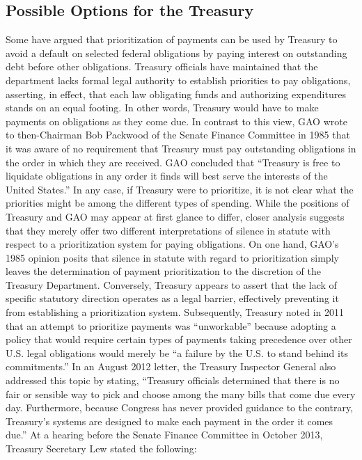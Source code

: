 \subsection{Possible Options for the Treasury}
Some have argued that prioritization of payments can be used by Treasury to avoid a default on selected federal obligations by paying interest on outstanding debt before other obligations. Treasury officials have maintained that the department lacks formal legal authority to establish priorities to pay obligations, asserting, in effect, that each law obligating funds and authorizing expenditures stands on an equal footing. In other words, Treasury would have to make payments on obligations as they come due.
\nextline
In contrast to this view, GAO wrote to then-Chairman Bob Packwood of the Senate Finance Committee in 1985 that it was aware of no requirement that Treasury must pay outstanding obligations in the order in which they are received. GAO concluded that “Treasury is free to liquidate obligations in any order it finds will best serve the interests of the United States.” In any case, if Treasury were to prioritize, it is not clear what the priorities might be among the different types of spending.
\nextline
While the positions of Treasury and GAO may appear at first glance to differ, closer analysis suggests that they merely offer two different interpretations of silence in statute with respect to a prioritization system for paying obligations. On one hand, GAO’s 1985 opinion posits that silence in statute with regard to prioritization simply leaves the determination of payment prioritization to the discretion of the Treasury Department. Conversely, Treasury appears to assert that the lack of specific statutory direction operates as a legal barrier, effectively preventing it from establishing a prioritization system.
\nextline
Subsequently, Treasury noted in 2011 that an attempt to prioritize payments was “unworkable” because adopting a policy that would require certain types of payments taking precedence over other U.S. legal obligations would merely be “a failure by the U.S. to stand behind its commitments.” In an August 2012 letter, the Treasury Inspector General also addressed this topic by stating, “Treasury officials determined that there is no fair or sensible way to pick and choose among the many bills that come due every day. Furthermore, because Congress has never provided guidance to the contrary, Treasury’s systems are designed to make each payment in the order it comes due.” At a hearing before the Senate Finance Committee in October 2013, Treasury Secretary Lew stated the following:

